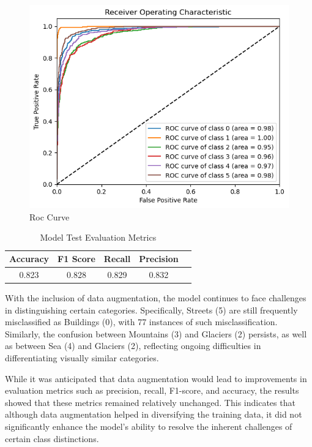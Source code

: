 \begin{figure}[H]
    \centering
    \includegraphics[width=1\linewidth]{images/modelo_aula_roc_dataaug.png}
    \caption{Roc Curve}
    \label{fig:rocincial}
\end{figure}

\begin{table}[H]
    \centering
    \caption{Model Test Evaluation Metrics} 
    \begin{tabular}{||c|c|c|c|c||} 
        \hline
        Accuracy & F1 Score & Recall & Precision \\
        \hline\hline
        0.823 & 0.828 & 0.829 & 0.832 \\
        \hline
    \end{tabular}
    \label{tab:tab_LogReg}
\end{table}


With the inclusion of data augmentation, the model continues to face challenges in distinguishing certain categories. Specifically, Streets (5) are still frequently misclassified as Buildings (0), with 77 instances of such misclassification. Similarly, the confusion between Mountains (3) and Glaciers (2) persists, as well as between Sea (4) and Glaciers (2), reflecting ongoing difficulties in differentiating visually similar categories.

While it was anticipated that data augmentation would lead to improvements in evaluation metrics such as precision, recall, F1-score, and accuracy, the results showed that these metrics remained relatively unchanged. This indicates that although data augmentation helped in diversifying the training data, it did not significantly enhance the model's ability to resolve the inherent challenges of certain class distinctions.

